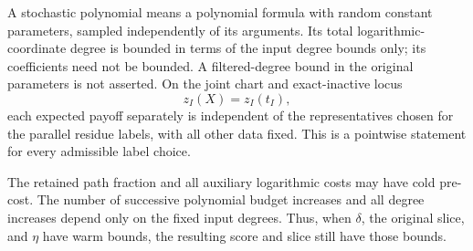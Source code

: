 \begin{theorem}
A stochastic polynomial means a polynomial formula with random
constant parameters, sampled independently of its arguments.  Its
total logarithmic-coordinate degree is bounded in terms of the
input degree bounds only; its coefficients need not be bounded.  A
filtered-degree bound in the original parameters is not asserted.
On the joint chart and exact-inactive locus
\begin{equation}
                    z_I(X)=z_I(t_I),
 \label{ap:active:exact-locus}
\end{equation}
each expected payoff separately is independent of the representatives
chosen for the parallel residue labels, with all other data fixed.
This is a pointwise statement for every admissible label choice.

The retained path fraction and all auxiliary logarithmic costs may
have cold pre-cost.  The number of successive polynomial budget
increases and all degree increases depend only on the fixed input
degrees.  Thus, when $\delta$, the original slice, and $\eta$ have
warm bounds, the resulting score and slice still have those bounds.
\end{theorem}

